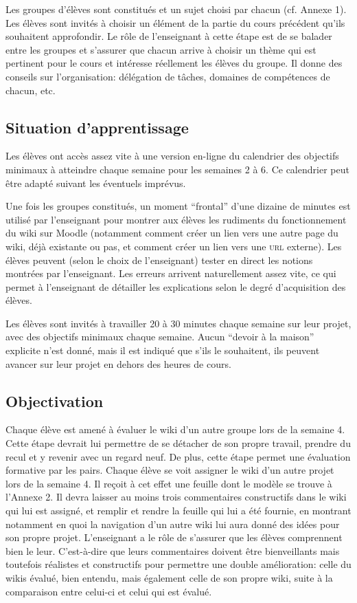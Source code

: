 \documentclass[11pt,bibliography=totoc]{scrartcl}
\newcommand\ajout[1]{{\color{blue} #1}}
\begin{document}
Les groupes d'élèves sont constitués et un sujet choisi par chacun (cf. Annexe
1). Les élèves sont invités à choisir un élément de la partie du cours précédent
qu'ils souhaitent approfondir. Le rôle de l'enseignant à cette étape est de se
balader entre les groupes et s'assurer que chacun arrive à choisir un thème qui
est pertinent pour le cours et intéresse réellement les élèves du
groupe. \ajout{Il donne des conseils sur l'organisation: délégation de tâches,
  domaines de compétences de chacun, etc.}

\subsection{Situation d'apprentissage}
Les élèves ont accès assez vite à une version en-ligne du calendrier des
objectifs minimaux à atteindre chaque semaine pour les semaines 2 à 6. Ce
calendrier peut être adapté suivant les éventuels imprévus.

Une fois les groupes constitués, un moment ``frontal'' d'une dizaine de minutes
est utilisé par l'enseignant pour montrer aux élèves les rudiments du
fonctionnement du wiki sur Moodle (notamment comment créer un lien vers une
autre page du wiki, déjà existante ou pas, et comment créer un lien vers une
\textsc{url} externe). \ajout {Les élèves peuvent (selon le choix de
  l'enseignant) tester en direct les notions montrées par l'enseignant. Les
  erreurs arrivent naturellement assez vite, ce qui permet à l'enseignant de
  détailler les explications selon le degré d'acquisition des élèves.}

Les élèves sont invités à travailler 20 à 30 minutes chaque semaine sur leur
projet, avec des objectifs minimaux chaque semaine. Aucun ``devoir à la maison''
explicite n'est donné, mais il est indiqué que s'ils le souhaitent, ils peuvent
avancer sur leur projet en dehors des heures de cours.

\subsection{Objectivation}
Chaque élève est amené à évaluer le wiki d'un autre groupe lors de la semaine
4. Cette étape devrait lui permettre de se détacher de son propre travail,
prendre du recul et y revenir avec un regard neuf. De plus, cette étape permet
une évaluation formative par les pairs. Chaque élève se voit assigner le wiki
d'un autre projet lors de la semaine 4. Il reçoit à cet effet une feuille dont
le modèle se trouve à l'Annexe 2. Il devra laisser au moins trois commentaires
constructifs dans le wiki qui lui est assigné, et remplir et rendre la feuille
qui lui a été fournie, en montrant notamment en quoi la navigation d'un autre
wiki lui aura donné des idées pour son propre projet.  \ajout {L'enseignant a le
  rôle de s'assurer que les élèves comprennent bien le leur. C'est-à-dire que
  leurs commentaires doivent être bienveillants mais toutefois réalistes et
  constructifs pour permettre une double amélioration: celle du wikis évalué,
  bien entendu, mais également celle de son propre wiki, suite à la comparaison
  entre celui-ci et celui qui est évalué.}
\end{document}
